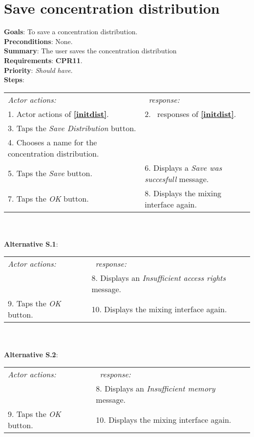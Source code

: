   \section{Save concentration distribution}
  \label{savedist}
  \textbf{Goals}: To save a concentration distribution.\\
  \textbf{Preconditions}: None. \\ %
  \textbf{Summary}: The user saves the concentration distribution\\
  \textbf{Requirements}: \textbf{CPR11}.\\
  \textbf{Priority}: \emph{Should have}.\\
  \textbf{Steps}: \\
  \begin{tabular}{ p{} p{} }
  	\emph{Actor actions:} & \emph{\projectname\ response:} \\
  	1. Actor actions of \textbf{\ref{initdist}}. & 2. \projectname\ responses of \textbf{\ref{initdist}}. \\
    3. Taps the \emph{Save Distribution} button.  & \\
    4. Chooses a name for the concentration distribution. & \\
    5. Taps the \emph{Save} button. & 6. Displays a \emph{Save was succesfull} message.\\
    7. Taps the \emph{OK} button. & 8. Displays the mixing interface again. \\
    \end{tabular}
    	 \\
    \\\textbf{Alternative S.1}: \\
    \begin{tabular}{ p{} p{} }
  	\emph{Actor actions:} & \emph{\projectname\ response:} \\
           &  8. Displays an \emph{Insufficient access rights} message. \\
	 9. Taps the \emph{OK} button. & 10. Displays the mixing interface again. \\
    \end{tabular}
    \\
    \\\textbf{Alternative S.2}: \\
    \begin{tabular}{ p{} p{} }
  	\emph{Actor actions:} & \emph{\projectname\ response:} \\
           &  8. Displays an \emph{Insufficient memory} message. \\
	 9. Taps the \emph{OK} button. & 10. Displays the mixing interface again. \\
    \end{tabular}
